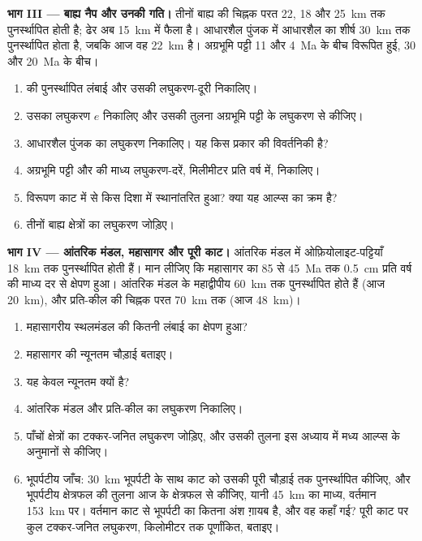 \begin{problem}[{सप्ताहांत समस्या --- काट का पुनर्स्थापन}]
\noindent\textbf{भाग III --- बाह्य नैप और उनकी गति।} तीनों बाह्य  की
चिह्नक परत 22, 18 और \qty{25}{km} तक पुनर्स्थापित होती है; ढेर अब
\qty{15}{km} में फैला है। आधारशैल पुंजक में आधारशैल का शीर्ष \qty{30}{km} तक पुनर्स्थापित होता है,
जबकि आज वह \qty{22}{km} है। अग्रभूमि पट्टी 11 और \qty{4}{Ma} के बीच विरूपित हुई,
 30 और \qty{20}{Ma} के बीच।
\begin{enumerate}[resume]
\item {} की पुनर्स्थापित लंबाई और उसकी लघुकरण-दूरी निकालिए।
\item उसका लघुकरण $e$ निकालिए और उसकी तुलना अग्रभूमि पट्टी के लघुकरण से कीजिए।
\item आधारशैल पुंजक का लघुकरण निकालिए। यह किस प्रकार की विवर्तनिकी है?
\item अग्रभूमि पट्टी और  की माध्य लघुकरण-दरें, मिलीमीटर प्रति
वर्ष में, निकालिए।
\item विरूपण काट में से किस दिशा में स्थानांतरित हुआ? क्या यह आल्प्स का
क्रम है?
\item तीनों बाह्य क्षेत्रों का लघुकरण जोड़िए।
\end{enumerate}

\noindent\textbf{भाग IV --- आंतरिक मंडल, महासागर और पूरी काट।}
आंतरिक मंडल में ओफ़ियोलाइट-पट्टियाँ \qty{18}{km} तक पुनर्स्थापित होती हैं। मान लीजिए कि महासागर का
85 से \qty{45}{Ma} तक \qty{0.5}{cm} प्रति वर्ष की माध्य दर से क्षेपण हुआ। आंतरिक मंडल के महाद्वीपीय
 \qty{60}{km} तक पुनर्स्थापित होते हैं (आज \qty{20}{km}), और
प्रति-कील की चिह्नक परत \qty{70}{km} तक (आज \qty{48}{km})।
\begin{enumerate}[resume]
\item महासागरीय स्थलमंडल की कितनी लंबाई का क्षेपण हुआ?
\item महासागर की न्यूनतम चौड़ाई बताइए।
\item यह केवल न्यूनतम क्यों है?
\item आंतरिक मंडल और प्रति-कील का लघुकरण निकालिए।
\item पाँचों क्षेत्रों का टक्कर-जनित लघुकरण जोड़िए, और उसकी तुलना इस अध्याय में
मध्य आल्प्स के अनुमानों से कीजिए।
\item भूपर्पटीय जाँच: \qty{30}{km} भूपर्पटी के साथ काट को उसकी पूरी चौड़ाई तक पुनर्स्थापित कीजिए, और
भूपर्पटीय क्षेत्रफल की तुलना आज के क्षेत्रफल से कीजिए,
यानी \qty{45}{km} का माध्य, वर्तमान \qty{153}{km} पर।
वर्तमान काट से भूपर्पटी का कितना अंश ग़ायब है, और वह कहाँ
गई? पूरी काट पर कुल टक्कर-जनित लघुकरण, किलोमीटर तक पूर्णांकित, बताइए।
\end{enumerate}
\end{problem}
